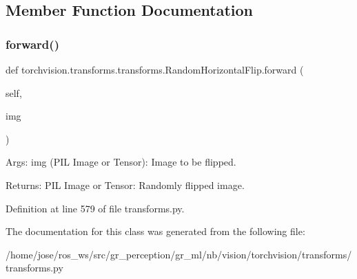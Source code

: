 \subsection{Member Function Documentation}
\mbox{\label{classtorchvision_1_1transforms_1_1transforms_1_1RandomHorizontalFlip_af963493e3a811fa32818de80f22e91ed}} 
\subsubsection{\texorpdfstring{forward()}{forward()}}
{\footnotesize\ttfamily def torchvision.\+transforms.\+transforms.\+Random\+Horizontal\+Flip.\+forward (\begin{DoxyParamCaption}\item[{}]{self,  }\item[{}]{img }\end{DoxyParamCaption})}

\begin{DoxyVerb}Args:
    img (PIL Image or Tensor): Image to be flipped.

Returns:
    PIL Image or Tensor: Randomly flipped image.
\end{DoxyVerb}
 

Definition at line 579 of file transforms.\+py.



The documentation for this class was generated from the following file\+:\begin{DoxyCompactItemize}
\item 
/home/jose/ros\+\_\+ws/src/gr\+\_\+perception/gr\+\_\+ml/nb/vision/torchvision/transforms/transforms.\+py\end{DoxyCompactItemize}
